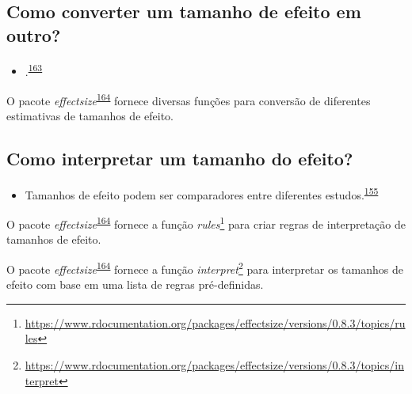 \documentclass[
  a4paper,
]{book}
\providecommand{\tightlist}{%
  \setlength{\itemsep}{0pt}\setlength{\parskip}{0pt}}
\renewcommand{\href}[2]{#2\footnote{\url{#1}}}
\newenvironment{infobox}[1]
  {
  \begin{itemize}
  \renewcommand{\labelitemi}{
    \raisebox{-.7\height}[0pt][0pt]{
      {\setkeys{Gin}{width=3em,keepaspectratio}
        \texttt{[image: \#1]}}
    }
  }
  \setlength{\fboxsep}{1em}
  \begin{blackbox}
  \item
  }
  {
  \end{blackbox}
  \end{itemize}
  }
\begin{document}
\hypertarget{como-converter-um-tamanho-de-efeito-em-outro}{%
\subsection{Como converter um tamanho de efeito em outro?}\label{como-converter-um-tamanho-de-efeito-em-outro}}

\begin{itemize}
\tightlist
\item
  .\textsuperscript{\protect\hyperlink{ref-Kim2015}{163}}
\end{itemize}

\begin{infobox}{images/Rlogo}
O pacote \emph{effectsize}\textsuperscript{\protect\hyperlink{ref-effectsize}{164}} fornece diversas funções para conversão de diferentes estimativas de tamanhos de efeito.

\end{infobox}

\hypertarget{como-interpretar-um-tamanho-do-efeito}{%
\subsection{Como interpretar um tamanho do efeito?}\label{como-interpretar-um-tamanho-do-efeito}}

\begin{itemize}
\tightlist
\item
  Tamanhos de efeito podem ser comparadores entre diferentes estudos.\textsuperscript{\protect\hyperlink{ref-Sullivan2012}{155}}
\end{itemize}

\begin{infobox}{images/Rlogo}
O pacote \emph{effectsize}\textsuperscript{\protect\hyperlink{ref-effectsize}{164}} fornece a função \href{https://www.rdocumentation.org/packages/effectsize/versions/0.8.3/topics/rules}{\emph{rules}} para criar regras de interpretação de tamanhos de efeito.

\end{infobox}

\begin{infobox}{images/Rlogo}
O pacote \emph{effectsize}\textsuperscript{\protect\hyperlink{ref-effectsize}{164}} fornece a função \href{https://www.rdocumentation.org/packages/effectsize/versions/0.8.3/topics/interpret}{\emph{interpret}} para interpretar os tamanhos de efeito com base em uma lista de regras pré-definidas.

\end{infobox}
\end{document}
